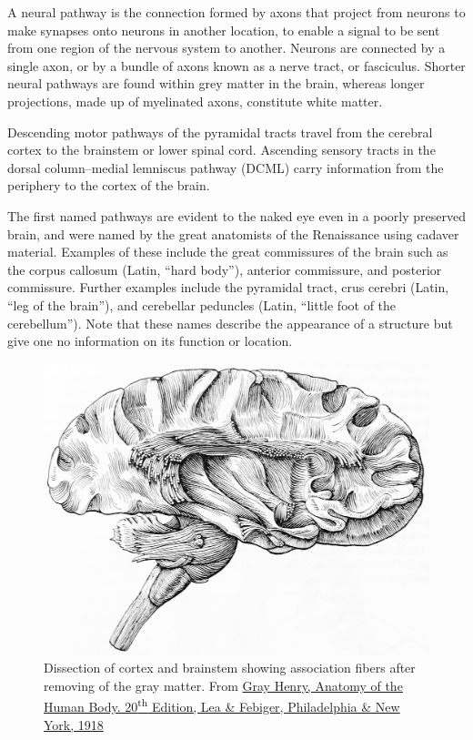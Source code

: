 A neural pathway is the connection formed by axons that project from neurons to make synapses onto neurons in another location, to enable a signal to be sent from one region of the nervous system to another. Neurons are connected by a single axon, or by a bundle of axons known as a nerve tract, or fasciculus. Shorter neural pathways are found within grey matter in the brain, whereas longer projections, made up of myelinated axons, constitute white matter.

Descending motor pathways of the pyramidal tracts travel from the cerebral cortex to the brainstem or lower spinal cord. Ascending sensory tracts in the dorsal column--medial lemniscus pathway (DCML) carry information from the periphery to the cortex of the brain.

The first named pathways are evident to the naked eye even in a poorly preserved brain, and were named by the great anatomists of the Renaissance using cadaver material. Examples of these include the great commissures of the brain such as the corpus callosum (Latin, ``hard body''), anterior commissure, and posterior commissure. Further examples include the pyramidal tract, crus cerebri (Latin, ``leg of the brain''), and cerebellar peduncles (Latin, ``little foot of the cerebellum''). Note that these names describe the appearance of a structure but give one no information on its function or location.



\begin{figure}

{\centering \includegraphics[width=0.7\linewidth]{./figures/cns/GrayAnat1918p846} 

}

\caption{Dissection of cortex and brainstem showing association fibers after removing of the gray matter. From \href{https://archive.org/details/anatomyofhumanbo1918gray/page/n6/mode/2up}{Gray Henry, Anatomy of the Human Body. 20\textsuperscript{th} Edition, Lea \& Febiger, Philadelphia \& New York, 1918}}\label{fig:associfibers}
\end{figure}

